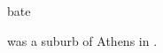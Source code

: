\documentclass{stex}
\begin{document}
\begin{smodule}{bate}
\begin{sparagraph}[style=symdoc]
 was a suburb of Athens in .
\end{sparagraph}
\end{smodule}
\end{document}
